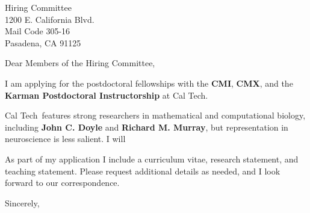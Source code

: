 \documentclass[11pt,a4paper]{letter}
\begin{document}
\def\School{Cal Tech}
\begin{letter}
{Hiring Committee\\
1200 E. California Blvd.\\
Mail Code 305-16\\
Pasadena, CA 91125
}


\opening{Dear Members of the Hiring Committee,}

I am applying for the postdoctoral fellowships with the \textbf{CMI}, \textbf{CMX}, and the \textbf{Karman Postdoctoral Instructorship} at \School. 



\School~features strong researchers in mathematical and computational biology, including \textbf{John C. Doyle} and \textbf{Richard M. Murray}, but representation in neuroscience is less salient. I will 



As part of my application I include a curriculum vitae, research statement, and teaching statement. Please request additional details as needed, and I look forward to our correspondence.

\closing{Sincerely,}
\end{letter}
\end{document}
